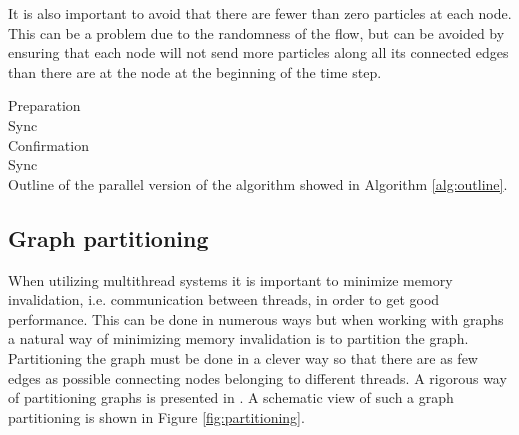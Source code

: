 It is also important to avoid that there are fewer than zero particles at each node. This can be a problem due to the randomness of the flow, but can be avoided by ensuring that each node will not send more particles along all its connected edges than there are at the node at the beginning of the time step.

{
\vspace{1em}
\begin{algorithm}[H]
Preparation\\
Sync\\
Confirmation\\
Sync\\
\caption{Outline of the parallel version of the algorithm showed in Algorithm \ref{alg:outline}.}
\label{alg:parallel}
\end{algorithm}
\vspace{1em}
}

\subsection{Graph partitioning}
When utilizing multithread systems it is important to minimize memory invalidation, i.e. communication between threads, in order to get good performance. This can be done in numerous ways but when working with graphs a natural way of minimizing memory invalidation is to partition the graph. Partitioning the graph must be done in a clever way so that there are as few edges as possible connecting nodes belonging to different threads. A rigorous way of partitioning graphs is presented in \cite{Lasalle}. A schematic view of such a graph partitioning is shown in Figure \ref{fig:partitioning}. 

